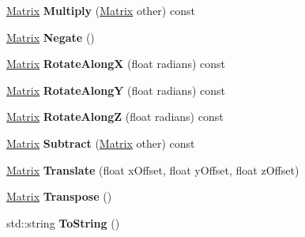 \begin{DoxyCompactItemize}
\item 
\hypertarget{struct_jade_1_1_math_1_1_matrix_a449adacaa4ef60d602e95f73d0d12c8a}{}\hyperlink{struct_jade_1_1_math_1_1_matrix}{Matrix} {\bfseries Multiply} (\hyperlink{struct_jade_1_1_math_1_1_matrix}{Matrix} other) const \label{struct_jade_1_1_math_1_1_matrix_a449adacaa4ef60d602e95f73d0d12c8a}

\item 
\hypertarget{struct_jade_1_1_math_1_1_matrix_a93092c82d04a623e9da883b5288b20b1}{}\hyperlink{struct_jade_1_1_math_1_1_matrix}{Matrix} {\bfseries Negate} ()\label{struct_jade_1_1_math_1_1_matrix_a93092c82d04a623e9da883b5288b20b1}

\item 
\hypertarget{struct_jade_1_1_math_1_1_matrix_a930c8e6f7409fbab5f4d30946fc411a5}{}\hyperlink{struct_jade_1_1_math_1_1_matrix}{Matrix} {\bfseries Rotate\+Along\+X} (float radians) const \label{struct_jade_1_1_math_1_1_matrix_a930c8e6f7409fbab5f4d30946fc411a5}

\item 
\hypertarget{struct_jade_1_1_math_1_1_matrix_a874b086183562b6d3c206d3aa89357a2}{}\hyperlink{struct_jade_1_1_math_1_1_matrix}{Matrix} {\bfseries Rotate\+Along\+Y} (float radians) const \label{struct_jade_1_1_math_1_1_matrix_a874b086183562b6d3c206d3aa89357a2}

\item 
\hypertarget{struct_jade_1_1_math_1_1_matrix_a4e611999b9d39fb3027f2c9007a1f930}{}\hyperlink{struct_jade_1_1_math_1_1_matrix}{Matrix} {\bfseries Rotate\+Along\+Z} (float radians) const \label{struct_jade_1_1_math_1_1_matrix_a4e611999b9d39fb3027f2c9007a1f930}

\item 
\hypertarget{struct_jade_1_1_math_1_1_matrix_af5c307e7450771500c0b1199f7f04096}{}\hyperlink{struct_jade_1_1_math_1_1_matrix}{Matrix} {\bfseries Subtract} (\hyperlink{struct_jade_1_1_math_1_1_matrix}{Matrix} other) const \label{struct_jade_1_1_math_1_1_matrix_af5c307e7450771500c0b1199f7f04096}

\item 
\hypertarget{struct_jade_1_1_math_1_1_matrix_aa1a013157118a87cd242d25e668aa3b6}{}\hyperlink{struct_jade_1_1_math_1_1_matrix}{Matrix} {\bfseries Translate} (float x\+Offset, float y\+Offset, float z\+Offset)\label{struct_jade_1_1_math_1_1_matrix_aa1a013157118a87cd242d25e668aa3b6}

\item 
\hypertarget{struct_jade_1_1_math_1_1_matrix_ac235e6add4163f779f1a3b007ee0f6d7}{}\hyperlink{struct_jade_1_1_math_1_1_matrix}{Matrix} {\bfseries Transpose} ()\label{struct_jade_1_1_math_1_1_matrix_ac235e6add4163f779f1a3b007ee0f6d7}

\item 
\hypertarget{struct_jade_1_1_math_1_1_matrix_a913cad2a5906c10e1547ca26a1c3f18d}{}std\+::string {\bfseries To\+String} ()\label{struct_jade_1_1_math_1_1_matrix_a913cad2a5906c10e1547ca26a1c3f18d}

\end{DoxyCompactItemize}
